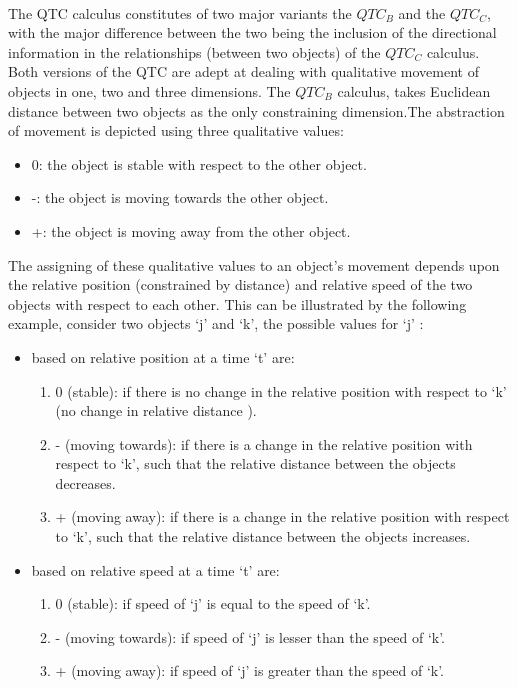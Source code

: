 	\paragraph{}The QTC calculus constitutes of two major variants the $QTC_B$ and the $QTC_C$, with the major difference between the two being the inclusion of the directional information in the relationships (between two objects) of the $QTC_C$ calculus. Both versions of the QTC are adept at dealing with qualitative movement of objects in one, two and three dimensions. The $QTC_B$ calculus, takes Euclidean distance between two objects as the only constraining dimension.The abstraction of movement is depicted using three qualitative values:
	\begin{itemize}
		\item 0: the object is stable with respect to the other object.
		\item -: the object is moving towards the other object.
		\item +: the object is moving away from the other object.
	\end{itemize}
	The assigning of these qualitative values to an object's movement depends upon the relative position (constrained by distance) and relative speed of the two objects with respect to each other. This can be illustrated by the following example, consider two objects `j' and `k', the possible values for `j' :
	
	\begin{itemize}
		\item based on relative position at a time `t' are:
		\begin{enumerate}
			\item 0 (stable): if there is no change in the relative position with respect to `k' (no change in relative distance ).
			
			\item - (moving towards): if there is a change in the relative position with respect to `k', such that the relative distance between the objects decreases.
			
			\item + (moving away): if there is a change in the relative position with respect to `k', such that the relative distance between the objects increases.
		\end{enumerate}
		\item based on relative speed at a time `t' are:
		\begin{enumerate}
			\item 0 (stable): if speed of `j' is equal to the speed of `k'.
			
			\item - (moving towards): if speed of `j' is lesser than the speed of `k'.
			
			\item + (moving away): if speed of `j' is greater than the speed of `k'.
		\end{enumerate}
	\end{itemize}

